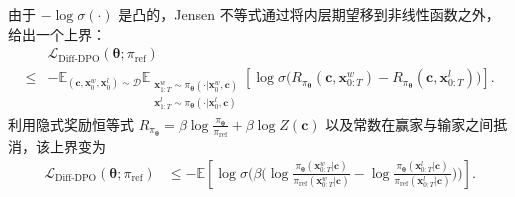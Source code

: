 由于 $-\log\sigma(\cdot)$ 是凸的，Jensen 不等式通过将内层期望移到非线性函数之外，给出一个上界：
\begin{align*}
&\mathcal L_{\mathrm{Diff\text{-}DPO}}(\bm\theta;\pi_{\mathrm{ref}})
\\ \le  &
-\mathbb E_{(\mathbf c,\mathbf x_0^w,\mathbf x_0^l)\sim\mathcal D}
  \mathbb E_{\substack{\mathbf x^w_{1:T}\sim \pi_{\bm\theta}(\cdot | \mathbf x_0^w,\mathbf c)\\[1pt]
                       \mathbf x^l_{1:T}\sim \pi_{\bm\theta}(\cdot | \mathbf x_0^l,\mathbf c)}}
\left[
\log \sigma \Big(
R_{\pi_{\bm\theta}}(\mathbf c,\mathbf x^w_{0:T})
-
R_{\pi_{\bm\theta}}(\mathbf c,\mathbf x^l_{0:T})
\Big)
\right].
\end{align*}
利用隐式奖励恒等式 $R_{\pi_{\bm\theta}}=\beta\log\frac{\pi_{\bm\theta}}{\pi_{\mathrm{ref}}}+\beta\log Z(\mathbf c)$ 以及常数在赢家与输家之间抵消，该上界变为
\begin{align}\label{eq:dpo-path-bound}
\mathcal L_{\mathrm{Diff\text{-}DPO}}(\bm\theta;\pi_{\mathrm{ref}})
& \le
-\mathbb E
\left[
\log \sigma \Big(
\beta\big(
\log\frac{\pi_{\bm\theta}(\mathbf x^w_{0:T}| \mathbf c)}{\pi_{\mathrm{ref}}(\mathbf x^w_{0:T}| \mathbf c)}
-
\log\frac{\pi_{\bm\theta}(\mathbf x^l_{0:T}| \mathbf c)}{\pi_{\mathrm{ref}}(\mathbf x^l_{0:T}| \mathbf c)}
\big)
\Big)
\right].
\end{align}

